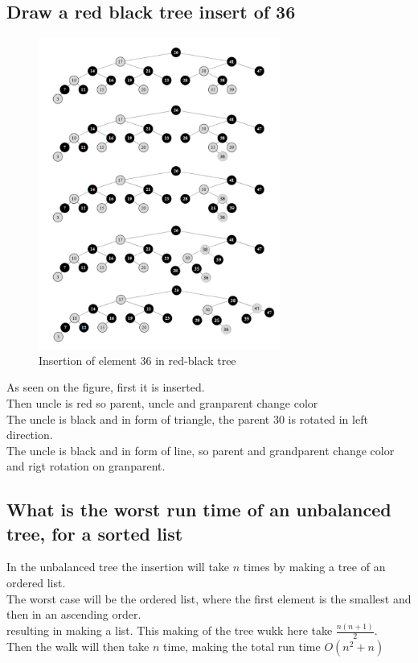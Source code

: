 \documentclass[12pt, a4paper]{article}
\begin{document}
			\subsection{Draw a red black tree insert of 36}
				\begin{figure}[h!]
					\center
					\includegraphics[width=300px]{assets/week10Exercise4.png}
					\caption{Insertion of element 36 in red-black tree}
				\end{figure}
				As seen on the figure, first it is inserted.\\
				Then uncle is red so parent, uncle and granparent change color\\
				The uncle is black and in form of triangle, the parent 30 is rotated in left direction.\\
				The uncle is black and in form of line, so parent and grandparent change color and rigt rotation on granparent.\\
			\subsection{What is the worst run time of an unbalanced tree, for a sorted list}
				In the unbalanced tree the insertion will take $n$ times by making a tree of an ordered list.\\
				The worst case will be the ordered list, where the first element is the smallest and then in an ascending order.\\
				resulting in making a list. This making of the tree wukk here take $\frac{n(n+1)}{2}$.\\
				Then the walk will then take $n$ time, making the total run time $O(n^2+n)$
\end{document}
